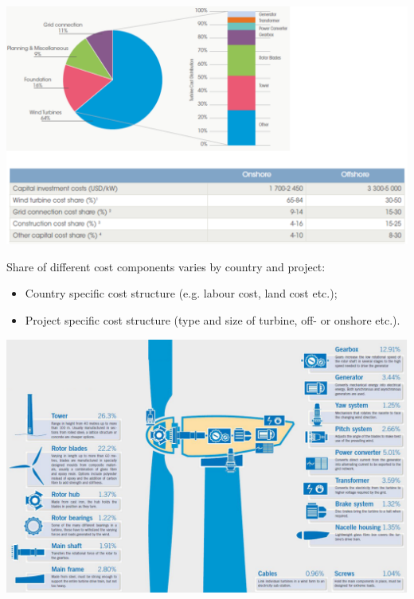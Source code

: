 \documentclass{article}
\begin{document}
\begin{center}
    \includegraphics[width=\textwidth]{media/investment.png}
\end{center}

Share of different cost components varies by country and project:
\begin{itemize}
    \item Country specific cost structure (e.g. labour cost, land cost etc.);
    \item Project specific cost structure (type and size of turbine, off- or onshore etc.).
\end{itemize}

\begin{center}
    \includegraphics[width=\textwidth]{media/eolic_turbine.png}
\end{center}
\end{document}

